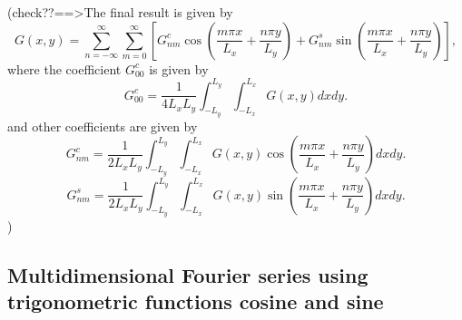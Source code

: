 \documentclass{article}
\begin{document}
(check??==>The final result is given by
\begin{equation}
  \label{2-13-e10} G (x, y) = \sum_{n = - \infty}^{\infty} \sum_{m =
  0}^{\infty} \left[ G_{n m}^c \cos \left( \frac{m \pi x}{L_x} + \frac{n \pi
  y}{L_y} \right) + G_{n m}^s \sin \left( \frac{m \pi x}{L_x} + \frac{n \pi
  y}{L_y} \right) \right],
\end{equation}
where the coefficient $G_{00}^c$ is given by
\begin{equation}
  G_{00}^c = \frac{1}{4 L_x L_y} \int_{- L_y}^{L_y} \int^{L_x}_{- L_x} G (x,
  y) d x d y.
\end{equation}
and other coefficients are given by
\begin{equation}
  G_{n m}^c = \frac{1}{2 L_x L_y} \int_{- L_y}^{L_y} \int^{L_x}_{- L_x} G (x,
  y) \cos \left( \frac{m \pi x}{L_x} + \frac{n \pi y}{L_y} \right) d x d y.
\end{equation}
\begin{equation}
  \label{2-13-e11} G_{n m}^s = \frac{1}{2 L_x L_y} \int_{- L_y}^{L_y}
  \int^{L_x}_{- L_x} G (x, y) \sin \left( \frac{m \pi x}{L_x} + \frac{n \pi
  y}{L_y} \right) d x d y.
\end{equation}
)

\subsection{\label{10-23-8}Multidimensional Fourier series using trigonometric
functions cosine and sine}
\end{document}
